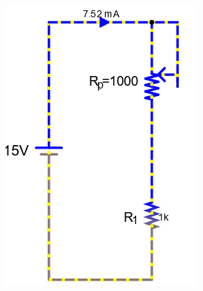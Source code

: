 \documentclass[a4paper]{article}
\begin{document}
\begin{figure}[H]
\begin{subfigure}{0.333\textwidth}
        \includegraphics[width=.9\linewidth]{pot4}
    \end{subfigure}
    \begin{subfigure}{0.333\textwidth}

\end{subfigure}
\end{figure}
\end{document}
